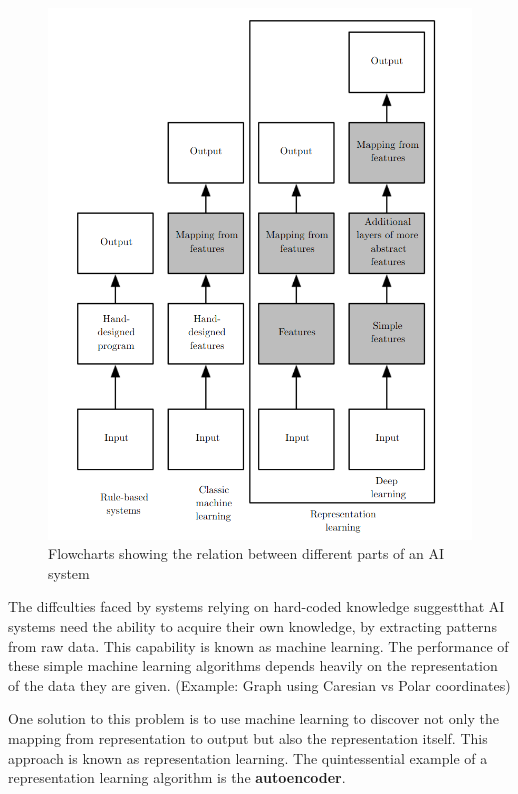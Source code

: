 \documentclass[../Main.tex]{subfiles}
\begin{document}
\begin{figure}[H]
    \centering
    \includegraphics[width=0.75\linewidth]{Images/deepl-diff.png}
    \caption{Flowcharts showing the relation between different parts of an AI system}
\end{figure}

The diffculties faced by systems relying on hard-coded knowledge suggestthat AI systems 
need the ability to acquire their own knowledge, by extracting
patterns from raw data. This capability is known as machine learning.
The performance of these simple machine learning algorithms depends heavily
on the representation of the data they are given. (Example: Graph using Caresian vs Polar coordinates)


One solution to this problem is to use machine learning to discover not only
the mapping from representation to output but also the representation itself.
This approach is known as representation learning.
The quintessential example of a representation learning algorithm is the \textbf{autoencoder}.
\end{document}
